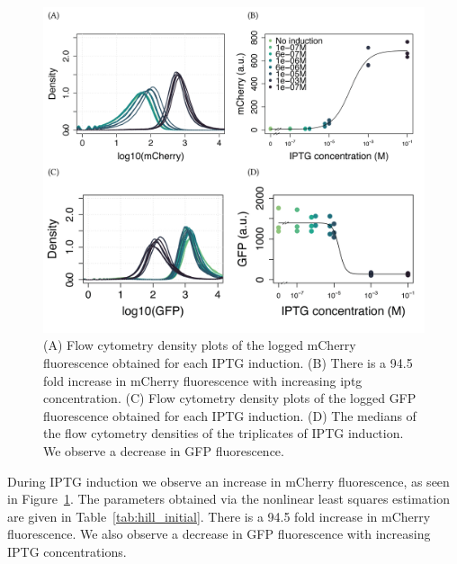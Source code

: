


\begin{figure}[tb]
	\begin{center}
\includegraphics[width=\textwidth]{../../chapters/chapterABCFlow/images/pKDL071_concentrations_model_fit-01.png}
\caption[Characterisation of pKDL071 after \acrshort{iptg} induction]{\label{fig:switch_concentrations_model} (A) Flow cytometry density plots of the logged mCherry fluorescence obtained for each IPTG induction. (B) There is a 94.5 fold increase in mCherry fluorescence with increasing \acrshort{iptg} concentration. (C) Flow cytometry density plots of the logged GFP fluorescence obtained for each IPTG induction. (D) The medians of the flow cytometry densities of the triplicates of IPTG induction. We observe a decrease in GFP fluorescence.}
\end{center}
\end{figure}


During IPTG induction we observe an increase in mCherry fluorescence, as seen in Figure~\ref{fig:switch_concentrations_model}. The parameters obtained via the nonlinear least squares estimation are given in Table~\ref{tab:hill_initial}. There is a 94.5 fold increase in mCherry fluorescence.  We also observe a decrease in GFP fluorescence with increasing IPTG concentrations. 


